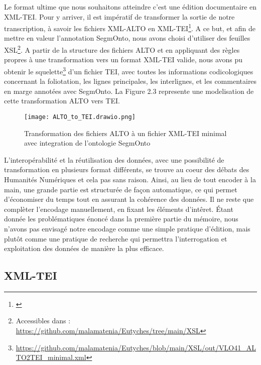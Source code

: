 \documentclass[a4paper, twoside, 12pt]{book}
\begin{document}
Le format ultime que nous souhaitons atteindre c'est une édition documentaire en XML-TEI. Pour y arriver, il est impératif de transformer la sortie de notre transcription, à savoir les fichiers XML-ALTO en XML-TEI\footnote{\cite{janes2021towards}}. A ce but, et afin de mettre en valeur l'annotation SegmOnto, nous avons choisi d'utiliser des feuilles XSL\footnote{ Accessibles dans : \url{https://github.com/malamatenia/Eutyches/tree/main/XSL}}. A partir de la structure des fichiers ALTO et en appliquant des règles propres à une transformation vers un format XML-TEI valide, nous avons pu obtenir le squelette\footnote{\url{https://github.com/malamatenia/Eutyches/blob/main/XSL/out/VLO41_ALTO2TEI_minimal.xml}} d'un fichier TEI, avec toutes les informations codicologiques concernant la foliotation, les lignes principales, les interlignes, et les commentaires en marge annotées avec SegmOnto. La Figure 2.3 represente une modelisation de cette transformation ALTO vers TEI. \\

\begin{figure}[H]
    \centering
    \texttt{[image: ALTO\_to\_TEI.drawio.png]}
    \caption{ Transformation des fichiers ALTO à un fichier XML-TEI minimal avec integration de l'ontologie SegmOnto }
\end{figure}


L'interopérabilité et la réutilisation des données, avec une possibilité de transformation en plusieurs format différents, se trouve au coeur des débats des Humanités Numériques et cela pas sans raison. Ainsi, au lieu de tout encoder à la main, une grande partie est structurée de façon automatique, ce qui permet d'économiser du temps tout en assurant la cohérence des données. Il ne reste que complèter l'encodage manuellement, en fixant les éléments d'intêret. Étant donnée les problématiques énoncé dans la première partie du mémoire, nous n’avons pas envisagé notre encodage comme une simple pratique d’édition, mais plutôt comme une pratique de recherche qui permettra l'interrogation et exploitation des données de manière la plus efficace.

\subsection{XML-TEI}
\end{document}
